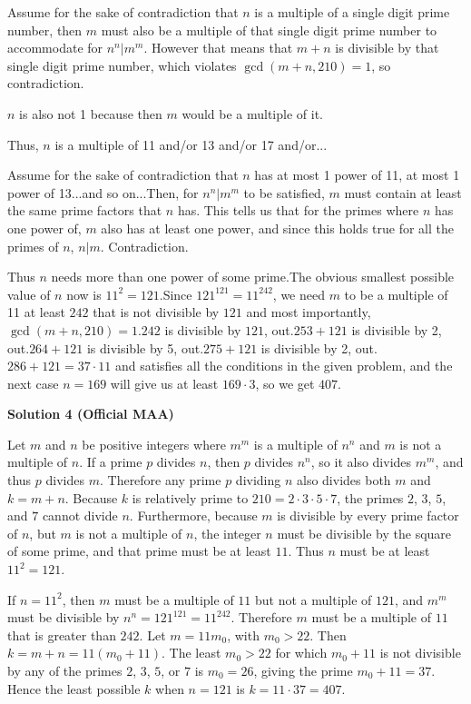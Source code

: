 \begin{enumerate}
Assume for the sake of contradiction that $n$ is a multiple of a single digit prime number, then $m$ must also be a multiple of that single digit prime number to accommodate for $n^n | m^m$. However that means that $m+n$ is divisible by that single digit prime number, which violates $\gcd(m+n,210) = 1$, so contradiction.

 $n$ is also not 1 because then $m$ would be a multiple of it.

 Thus, $n$ is a multiple of 11 and/or 13 and/or 17 and/or...

 Assume for the sake of contradiction that $n$ has at most 1 power of 11, at most 1 power of 13...and so on...Then, for $n^n | m^m$ to be satisfied, $m$ must contain at least the same prime factors that $n$ has. This tells us that for the primes where $n$ has one power of, $m$ also has at least one power, and since this holds true for all the primes of $n$, $n|m$. Contradiction.

 Thus $n$ needs more than one power of some prime.The obvious smallest possible value of $n$ now is $11^2 =121$.Since $121^{121}=11^{242}$, we need $m$ to be a multiple of 11 at least $242$ that is not divisible by $121$ and most importantly, $\gcd(m+n,210) = 1$.$242$ is divisible by $121$, out.$253+121$ is divisible by 2, out.$264+121$ is divisible by 5, out.$275+121$ is divisible by 2, out.$286+121=37\cdot 11$ and satisfies all the conditions in the given problem, and the next case $n=169$ will give us at least $169\cdot 3$, so we get $\boxed{407}$.

 



\textbf{Solution 4 (Official MAA)}

Let $m$ and $n$ be positive integers where $m^m$ is a multiple of $n^n$ and $m$ is not a multiple of $n$. If a prime $p$ divides $n$, then $p$ divides $n^n$, so it also divides $m^m$, and thus $p$ divides $m$. Therefore any prime $p$ dividing $n$ also divides both $m$ and $k = m + n$. Because $k$ is relatively prime to $210=2\cdot3\cdot5\cdot7$, the primes $2$, $3$, $5$, and $7$ cannot divide $n$. Furthermore, because $m$ is divisible by every prime factor of $n$, but $m$ is not a multiple of $n$, the integer $n$ must be divisible by the square of some prime, and that prime must be at least $11$. Thus $n$ must be at least $11^2 = 121$.

 If $n=11^2$, then $m$ must be a multiple of $11$ but not a multiple of $121$, and $m^m$ must be divisible by $n^n = 121^{121} = 11^{242}$. Therefore $m$ must be a multiple of $11$ that is greater than $242$. Let $m = 11m_0$, with $m_0 > 22$. Then $k = m + n = 11(m_0 + 11)$. The least $m_0 > 22$ for which $m_0 + 11$ is not divisible by any of the primes $2$, $3$, $5$, or $7$ is $m_0 = 26$, giving the prime $m_0 + 11 = 37$. Hence the least possible $k$ when $n = 121$ is $k = 11 \cdot 37 = 407$.


\end{enumerate}
